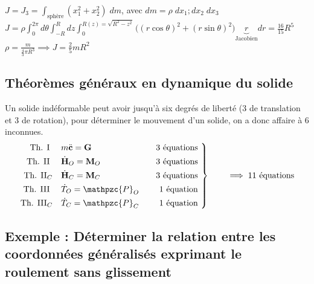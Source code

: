 \documentclass[a4paper]{article}
\begin{document}
$\displaystyle J = J_3 = \int_{\text{sphère}} ( x_1^2 + x_2^2 ) \; d m $, \qquad avec $ d m = \rho \; d x_1 ; d x_2 \; d x_3 $ \\
$\displaystyle J = \rho \int_0^{2 \pi} d \theta \int_{-R}^R d z \int_0^{R(z) = \sqrt{R^2 - z^2}} \big( (r \cos \theta)^2 + (r \sin \theta)^2 \big) \underbrace{r}_{\text{Jacobien}} d r = \frac{16}{15} R^5 $ \\
$\displaystyle \rho =  \frac{m}{\frac{4}{3} \pi R^3} \implies J = \frac{2}{5} m R^2 $





\subsection{Théorèmes généraux en dynamique du solide}






Un solide indéformable peut avoir jusqu'à six degrés de liberté (3 de translation et 3 de rotation), pour déterminer le mouvement d'un solide, on a donc affaire à 6 inconnues.
\[
\left.\begin{aligned}
\text{ Th. I } \quad & m \ddot{\textbf{c}} = \textbf{G} \quad & 3 \text{ équations } \\
\text{ Th. II } \quad & \dot{\textbf{H}}_O = \textbf{M}_O \quad & 3 \text{ équations } \\
\text{ Th. II}_C \quad & \dot{\textbf{H}}_C = \textbf{M}_C \quad & 3 \text{ équations } \\
\text{ Th. III } \quad & \dot{T}_O = \mathpzc{P}_O \quad & 1 \text{ équation } \\
\text{ Th. III}_C \quad & \dot{T}_C = \mathpzc{P}_C \quad & 1 \text{ équation }
\end{aligned}\right\rbrace \qquad \implies 11 \text{ équations }
\]





\subsection{Exemple : Déterminer la relation entre les coordonnées généralisés exprimant le roulement sans glissement}
\end{document}
